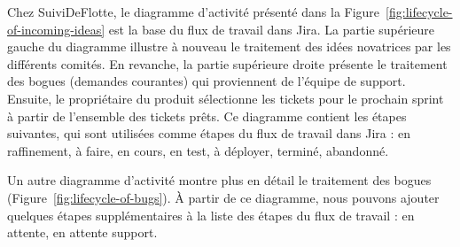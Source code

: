 Chez SuiviDeFlotte, le diagramme d'activité présenté dans la Figure~\ref{fig:lifecycle-of-incoming-ideas} est la base du flux de travail dans Jira. La partie supérieure gauche du diagramme illustre à nouveau le traitement des idées novatrices par les différents comités. En revanche, la partie supérieure droite présente le traitement des bogues (demandes courantes) qui proviennent de l'équipe de support. Ensuite, le propriétaire du produit sélectionne les tickets pour le prochain sprint à partir de l'ensemble des tickets prêts. Ce diagramme contient les étapes suivantes, qui sont utilisées comme étapes du flux de travail dans Jira : en raffinement, à faire, en cours, en test, à déployer, terminé, abandonné.

Un autre diagramme d'activité montre plus en détail le traitement des bogues (Figure~\ref{fig:lifecycle-of-bugs}). À partir de ce diagramme, nous pouvons ajouter quelques étapes supplémentaires à la liste des étapes du flux de travail : en attente, en attente support.

